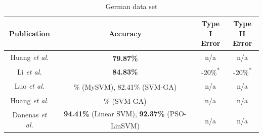 \documentclass{sig-alternate-05-2015}
\begin{document}
	\begin{table}
		\small
		\caption{German data set\textsuperscript{\textparagraph}}
		\label{table:german_dataset}	
		\begin{tabular}{c|c|c|c} \hline		
			Publication&Accuracy&\parbox[t]{1.2cm}{\centering Type I\\Error}&\parbox[t]{1.2cm}{\centering Type II\\Error}\rule{0pt}{3mm}\rule[-0mm]{0pt}{0pt}\\ \hline
			\parbox[t]{2.3cm}{Huang \textit{et al.} \cite{Huang2004543}}
			&\parbox[t]{2.3cm}{\centering \textbf{79.87\%}\textsuperscript{\textdagger}}
			&\parbox[t]{1.1cm}{\centering n/a}
			&\parbox[t]{1.2cm}{\centering n/a}\rule{0pt}{3.5mm}\rule[-0mm]{0pt}{0pt}\\ \hline
			\parbox[t]{2.3cm}{Li \textit{et al.} \cite{Li2006772}}
			&\parbox[t]{2.3cm}{\centering \textbf{84.83\%}}
			&\parbox[t]{1.1cm}{-20\%\textsuperscript{*}}
			&\parbox[t]{1.2cm}{-20\%\textsuperscript{*}}\\ \hline
			\parbox[t]{2.3cm}{Luo \textit{et al.} \cite{Luo20097562}}
			&\parbox[t]{2.3cm}{\% (MySVM), 82.41\% (SVM-GA)\textsuperscript{\textdagger}}
			&\parbox[t]{1.1cm}{\centering n/a}
			&\parbox[t]{1.2cm}{\centering n/a}\rule{0pt}{3.5mm}\rule[-0mm]{0pt}{0pt}\\ \hline
			\parbox[t]{2.3cm}{Huang \textit{et al.} \cite{Huang2007847}}
			&\parbox[t]{2.3cm}{\% (SVM-GA)\textsuperscript{\textdagger}}
			&\parbox[t]{1.1cm}{\centering n/a}
			&\parbox[t]{1.2cm}{\centering n/a}\rule{0pt}{3.5mm}\rule[-0mm]{0pt}{0pt}\\ \hline
			\parbox[t]{2.3cm}{Danenas \textit{et al.} \cite{Danenas20153194}}
			&\parbox[t]{2.3cm}{\centering \textbf{94.41\%} (Linear SVM), \textbf{92.37\%} (PSO-LinSVM)\textsuperscript{\textdagger}}
			&\parbox[t]{1.1cm}{\centering n/a\textsuperscript{\textdaggerdbl}}
			&\parbox[t]{1.2cm}{\centering n/a\textsuperscript{\textdaggerdbl}}\rule{0pt}{3.5mm}\rule[-8mm]{0pt}{0pt}		
		\end{tabular}		
	\end{table}
	
\end{document}
